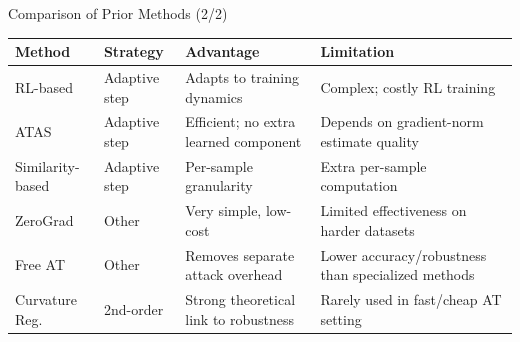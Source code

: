 \documentclass[11pt,aspectratio=169]{beamer}
\begin{document}
\begin{frame}{Comparison of Prior Methods (2/2)}
  \begin{table}
  \centering
  \vskip 0.15cm
  \scriptsize
  \renewcommand{\arraystretch}{1.5}
  \setlength{\tabcolsep}{6pt}
  \begin{tabular}{|p{1.8cm}|p{1.8cm}|p{3.6cm}|p{3.6cm}|}
  \hline
  \textbf{Method} & \textbf{Strategy} & \textbf{Advantage} & \textbf{Limitation} \\
  \hline
  RL-based \cite{nie2021adaptive} & Adaptive step & Adapts to training dynamics & Complex; costly RL training \\
  \hline
  ATAS \cite{huang2023fast} & Adaptive step & Efficient; no extra learned component & Depends on gradient-norm estimate quality \\
  \hline
  Similarity-based \cite{zhao2025avoiding} & Adaptive step & Per-sample granularity & Extra per-sample computation \\
  \hline
  ZeroGrad \cite{golgooni2023zerograd} & Other & Very simple, low-cost & Limited effectiveness on harder datasets \\
  \hline
  Free AT \cite{shafahi2019adversarial} & Other & Removes separate attack overhead & Lower accuracy/robustness than specialized methods \\
  \hline
  Curvature Reg. \cite{moosavi2019robustness} & 2nd-order & Strong theoretical link to robustness & Rarely used in fast/cheap AT setting \\
  \hline
  \end{tabular}
  \end{table}
\end{frame}
\end{document}
